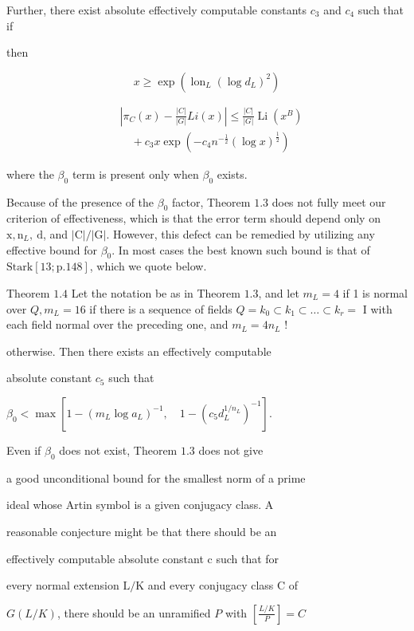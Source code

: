 Further, there exist absolute effectively computable constants $c_{3}$ and $c_{4}$ such that if

then

$$
x \geqslant \exp \left(\operatorname{lon}_{L}\left(\log d_{L}\right)^{2}\right)
$$

$$
\begin{aligned}
&\left|\pi_{C}(x)-\frac{|C|}{|G|} L i(x)\right| \leqslant \frac{|C|}{|G|} \operatorname{Li}\left(x^{B}\right) \\
&\quad+c_{3} x \exp \left(-c_{4} n^{-\frac{1}{2}}(\log x)^{\frac{1}{2}}\right)
\end{aligned}
$$

where the $\beta_{0}$ term is present only when $\beta_{0}$ exists.

Because of the presence of the $\beta_{0}$ factor, Theorem $1.3$ does not fully meet our criterion of effectiveness, which is that the error term should depend only on $\mathrm{x}, \mathrm{n}_{L}, \mathrm{~d}$, and $|\mathrm{C}| /|\mathrm{G}|$. However, this defect can be remedied by utilizing any effective bound for $\beta_{0}$. In most cases the best known such bound is that of $\mathrm{Stark}[13 ; \mathrm{p} .148]$, which we quote below.

Theorem $1.4$ Let the notation be as in Theorem $1.3$, and let $m_{L}=4$ if 1 is normal over $Q, m_{L}=16$ if there is a sequence of fields $Q=k_{0} \subset k_{1} \subset \ldots \subset k_{r}=$ I with each field normal over the preceding one, and $m_{L}=4 n_{L}$ !

otherwise. Then there exists an effectively computable

absolute constant $c_{5}$ such that

$\beta_{0}<\max \left[1-\left(m_{L} \log a_{L}\right)^{-1}, \quad 1-\left(c_{5} d_{L}^{1 / n_{L}}\right)^{-1}\right]$.

Even if $\beta_{0}$ does not exist, Theorem $1.3$ does not give

a good unconditional bound for the smallest norm of a prime

ideal whose Artin symbol is a given conjugacy class. A

reasonable conjecture might be that there should be an

effectively computable absolute constant c such that for

every normal extension $\mathrm{L} / \mathrm{K}$ and every conjugacy class $\mathrm{C}$ of

$G(L / K)$, there should be an unramified $P$ with $\left[\frac{L / K}{P}\right]=C$

